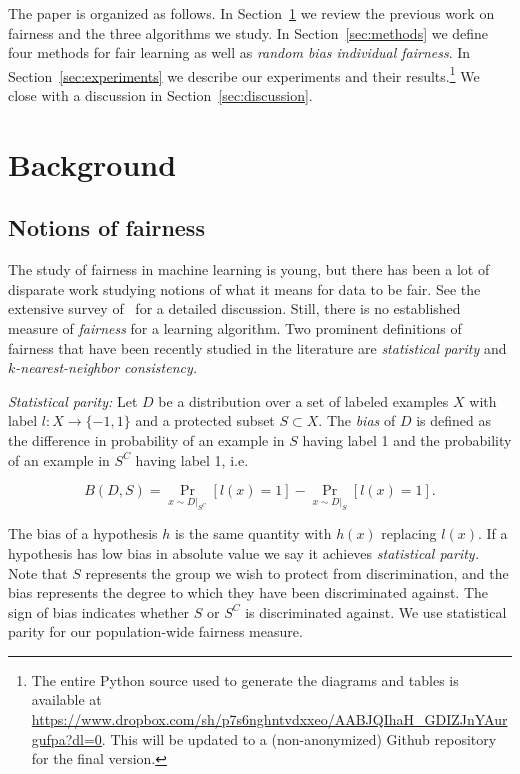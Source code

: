 \documentclass[conference]{IEEEtran}
\begin{document}
The paper is organized as follows. In Section~\ref{sec:background} we review
the previous work on fairness and the three algorithms we study.
In Section~\ref{sec:methods} we define four methods for fair learning as well
as \emph{random bias individual fairness}.  In Section~\ref{sec:experiments} we
describe our experiments and their results.\footnote{The entire Python source
used to generate the diagrams and tables is available at
\url{https://www.dropbox.com/sh/p7s6nghntvdxxeo/AABJQIhaH_GDIZJnYAurgufpa?dl=0}.
This will be updated to a (non-anonymized) Github repository for the final
version.}  We close with a discussion in Section~\ref{sec:discussion}.
 

\section{Background} \label{sec:background}

\subsection{Notions of fairness} 

The study of fairness in machine learning is young, but there has been a lot of
disparate work studying notions of what it means for data to be fair. See the
extensive survey of~\cite{RomeiR14} for a detailed discussion. Still, there is no
established measure of \emph{fairness} for a learning algorithm. Two
prominent definitions of fairness that have been recently studied in the
literature are \emph{statistical parity} and \emph{$k$-nearest-neighbor
consistency.}

\emph{Statistical parity:} Let $D$ be a distribution over a set of labeled
examples $X$ with label $l : X \to \{-1, 1\}$ and a protected subset $S \subset
X$. The \emph{bias} of $D$ is defined as the difference in probability of an
example in $S$ having label 1 and the probability of an example in $S^C$ having
label 1, i.e.

$$ 
   B(D, S) = \Pr_{x \sim D|_{S^C}}[l(x) = 1] - \Pr_{x \sim D|_{S}}[l(x) = 1].
$$

The bias of a hypothesis $h$ is the same quantity with $h(x)$ replacing $l(x)$.
If a hypothesis has low bias in absolute value we say it achieves
\emph{statistical parity.} Note that $S$ represents the group we wish to
protect from discrimination, and the bias represents the degree to which they
have been discriminated against.  The sign of bias indicates whether $S$ or
$S^C$ is discriminated against. We use statistical parity for our
population-wide fairness measure.
\end{document}
